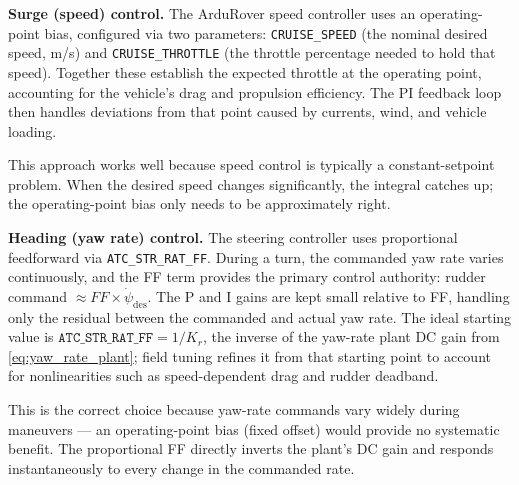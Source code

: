\documentclass[12pt]{article}
\begin{document}
\textbf{Surge (speed) control.}
The ArduRover speed controller uses an operating-point bias, configured via
two parameters: \texttt{CRUISE\_SPEED} (the nominal desired speed, m/s) and
\texttt{CRUISE\_THROTTLE} (the throttle percentage needed to hold that speed).
Together these establish the expected throttle at the operating point,
accounting for the vehicle's drag and propulsion efficiency.  The PI feedback
loop then handles deviations from that point caused by currents, wind, and
vehicle loading.

This approach works well because speed control is typically a constant-setpoint
problem.  When the desired speed changes significantly, the integral catches up;
the operating-point bias only needs to be approximately right.

\textbf{Heading (yaw rate) control.}
The steering controller uses proportional feedforward via
\texttt{ATC\_STR\_RAT\_FF}.  During a turn, the commanded yaw rate varies
continuously, and the FF term provides the primary control authority:
rudder command $\approx FF \times \dot\psi_\mathrm{des}$.  The P and I gains
are kept small relative to FF, handling only the residual between the
commanded and actual yaw rate.
The ideal starting value is $\mathtt{ATC\_STR\_RAT\_FF} = 1/K_r$, the
inverse of the yaw-rate plant DC gain from \cref{eq:yaw_rate_plant};
field tuning refines it from that starting point to account for
nonlinearities such as speed-dependent drag and rudder deadband.

This is the correct choice because yaw-rate commands vary widely during
maneuvers --- an operating-point bias (fixed offset) would provide no
systematic benefit.  The proportional FF directly inverts the plant's DC gain
and responds instantaneously to every change in the commanded rate.
\end{document}
